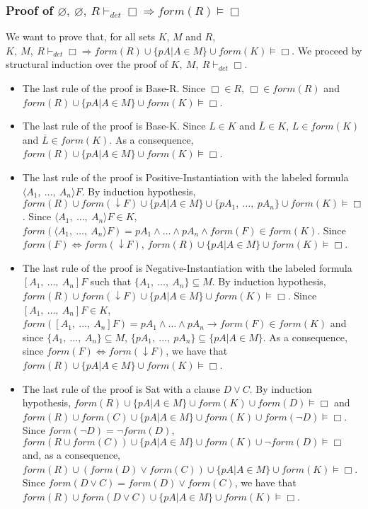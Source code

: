 \documentclass[a4paper,10pt]{report}
\newcommand{\dett}{\vdash_\mathit{det}}
\newcommand{\F}{\mathit{form}}
\begin{document}
\subsubsection*{Proof of $\varnothing,\ \varnothing,\ R\dett\Box\Rightarrow\F(R)\vDash\Box$}
We want to prove that, for all sets $K$, $M$ and $R$, $K,\ M,\ R\dett\Box\Rightarrow
\F(R)\cup\{pA|A\in M\}\cup\F(K)\vDash\Box$. We proceed by structural induction over the proof of
$K,\ M,\ R\dett\Box$.
\begin{itemize}
 \item The last rule of the proof is {\sc Base-R}. Since $\Box\in R$,
$\Box\in\F(R)$ and $\F(R)\cup\{pA|A\in M\}\cup\F(K)\vDash\Box$.
 \item The last rule of the proof is {\sc Base-K}. Since $L\in K$ and $\overline L\in K$,
$L\in \F(K)$ and $\overline L\in\F(K)$. As a consequence, $\F(R)\cup\{pA|A\in M\}\cup\F(K)\vDash\Box$.
 \item The last rule of the proof is {\sc Positive-Instantiation} with the labeled formula
$\langle A_1,\ \dots,\ A_n\rangle F$. By induction hypothesis,
$\F(R)\cup \F(\downarrow F)\cup \{pA|A\in M\}\cup\{pA_1,\ \dots,\ pA_n\}\cup \F(K)\vDash\Box$.
Since $\langle A_1,\ \dots,\ A_n\rangle F\in K$, $\F(\langle A_1,\ \dots,\ A_n\rangle F)=
pA_1\wedge\dots\wedge pA_n\wedge\F(F)\in \F(K)$. Since $\F(F)\Leftrightarrow\F(\downarrow F)$,
$\F(R)\cup\{pA|A\in M\}\cup\F(K)\vDash\Box$.
 \item The last rule of the proof is {\sc Negative-Instantiation} with the labeled formula
$[A_1,\ \dots,\ A_n]F$ such that $\{A_1,\ \dots,\ A_n\}\subseteq M$. By induction hypothesis,
$\F(R)\cup \F(\downarrow F)\cup \{pA|A\in M\}\cup \F(K)\vDash\Box$.
Since $[A_1,\ \dots,\ A_n]F\in K$,
$\F([A_1,\ \dots,\ A_n]F)=pA_1\wedge\dots\wedge pA_n\rightarrow \F(F)\in \F(K)$ and since
$\{A_1,\ \dots,\ A_n\}\subseteq M$, $\{pA_1,\ \dots,\ pA_n\}\subseteq\{pA|A\in M\}$.
As a consequence, since $\F(F)\Leftrightarrow\F(\downarrow F)$,
we have that $\F(R)\cup\{pA|A\in M\}\cup\F(K)\vDash\Box$.
 \item The last rule of the proof is {\sc Sat} with a clause $D\vee C$.
By induction hypothesis,
$\F(R)\cup\{pA|A\in M\}\cup\F(K)\cup\F(D)\vDash\Box$ and
$\F(R)\cup\F(C)\cup\{pA|A\in M\}\cup\F(K)\cup\F(\neg D)\vDash\Box$. Since
$\F(\neg D)=\neg\F(D)$,  $\F(R\cup\F(C))\cup\{pA|A\in M\}\cup\F(K)\cup\neg\F(D)\vDash\Box$ and,
as a consequence, $\F(R)\cup(\F(D)\vee\F(C))\cup\{pA|A\in M\}\cup\F(K)\vDash\Box$.
Since $\F(D\vee C)=\F(D)\vee\F(C)$, we have that
$\F(R)\cup\F(D\vee C)\cup\{pA|A\in M\}\cup\F(K)\vDash\Box$.
\end{itemize}
\end{document}
